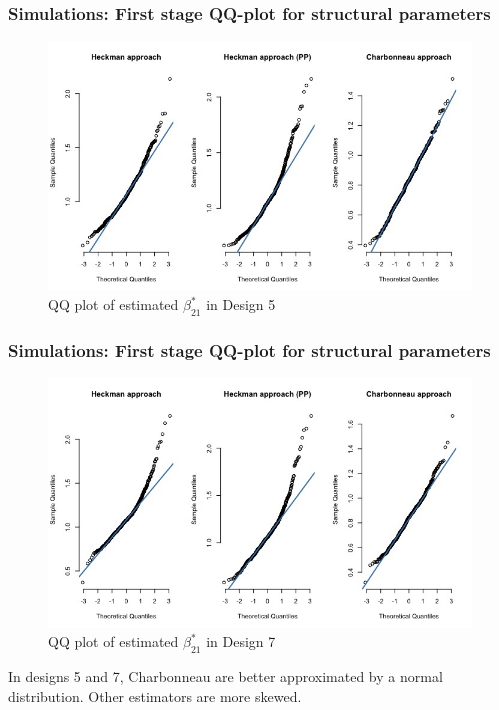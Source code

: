 \begin{frame}
    \frametitle{Simulations: First stage QQ-plot for structural parameters}
    \begin{figure}
        \centerline{\includegraphics[scale=.35]{content/Figures/QQ_beta_21_Design5.png}}
        \caption{\footnotesize{QQ plot of estimated $\beta_{21}^*$ in Design 5}}
        \label{QQ_beta_21_Design5}
      \end{figure}
\end{frame}

\begin{frame}
    \frametitle{Simulations: First stage QQ-plot for structural parameters}
    \begin{figure}
        \centerline{\includegraphics[scale=.35]{content/Figures/QQ_beta_21_Design7.png}}
        \caption{\footnotesize{QQ plot of estimated $\beta_{21}^*$ in Design 7}}
        \label{QQ_beta_21_Design7}
      \end{figure}
      In designs 5 and 7, Charbonneau are better approximated by a normal distribution. Other estimators are more skewed.
\end{frame}


